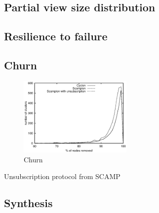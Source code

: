 \subsection{Partial view size distribution}

\subsection{Resilience to failure}

\subsection{Churn}

\begin{figure}
    \centering
    \includegraphics[width=0.49\textwidth]{img/churn.eps}
    \caption{Churn}
    \label{fig:churn}
\end{figure}

\begin{algorithm}

\caption{\label{algo:unsubscription}Unsubscription protocol from
  SCAMP~\cite{ganesh2003peer}}
\end{algorithm}

\subsection{Synthesis}

